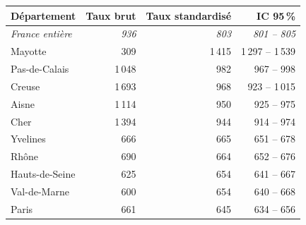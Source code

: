 \begin{tabular}{lrrr}
\toprule
Département & Taux brut & Taux standardisé & IC 95\,\% \\
\midrule
\textit{France entière} & \textit{936} & \textit{803} & \textit{801 -- 805} \\
\addlinespace
Mayotte & 309 & 1\,415 & 1\,297 -- 1\,539 \\
Pas-de-Calais & 1\,048 & 982 & 967 -- 998 \\
Creuse & 1\,693 & 968 & 923 -- 1\,015 \\
Aisne & 1\,114 & 950 & 925 -- 975 \\
Cher & 1\,394 & 944 & 914 -- 974 \\
\addlinespace
Yvelines & 666 & 665 & 651 -- 678 \\
Rhône & 690 & 664 & 652 -- 676 \\
Hauts-de-Seine & 625 & 654 & 641 -- 667 \\
Val-de-Marne & 600 & 654 & 640 -- 668 \\
Paris & 661 & 645 & 634 -- 656 \\
\bottomrule
\end{tabular}
